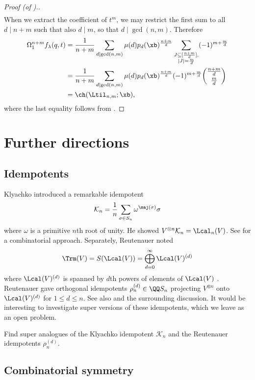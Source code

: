 \begin{proof}[Proof (of ).]
\begin{align*}
    \end{align*}
    When we extract the coefficient of $t^m$, we may restrict the first sum to all $d \mid n+m$ such that also $d \mid m$, so that $d \mid \gcd(n,m)$. Therefore
    \begin{align*}
    [t^m]\Omega_1^{n+m}f_\lambda(q,t) &= \frac{1}{n+m} \sum_{d \mid \gcd(n,m)} \mu(d) p_d(\xb)^\frac{n+m}{d} \sum_{\substack{J \subseteq [\frac{n+m}{d}], \\ |J| = \frac{m}{d}}} (-1)^{m + \frac{m}{d}} \\
    &= \frac{1}{n+m} \sum_{d \mid \gcd(n,m)} \mu(d) p_d(\xb)^\frac{n+m}{d} (-1)^{m + \frac{m}{d}} \binom{\frac{n+m}{d}}{\frac{m}{d}} \\
    &= \ch(\Ltil_{n,m};\xb),
    \end{align*}
    where the last equality follows from .
\end{proof}

\section{Further directions}\label{sec:addl}

\subsection{Idempotents}

Klyachko \cite{Kly} introduced a remarkable idempotent
  \[ \mathcal{K}_n = \frac{1}{n} \sum_{\sigma \in S_n} \omega^{\maj(\sigma)} \sigma \]
where $\omega$ is a primitive $n$th root of unity. He showed $V^{\otimes n} \mathcal{K}_n = \Lcal_n(V)$. See \cite[\S4]{Gar} for a combinatorial approach. Separately, Reutenauer noted
  \[ \Trm(V) = S(\Lcal(V)) = \bigoplus_{d=0}^\infty \Lcal(V)^{(d)} \]
where $\Lcal(V)^{(d)}$ is spanned by $d$th powers of elements of $\Lcal(V)$ \cite[\S2]{Reu-idemp}. Reutenauer gave orthogonal idempotents $\rho_n^{(d)} \in \QQ S_n$ projecting $V^{\otimes n}$ onto $\Lcal(V)^{(d)}$ for $1 \leq d \leq n$. See also \cite[Thm.~7.3]{Gar} and the surrounding discussion. It would be interesting to investigate super versions of these idempotents, which we leave as an open problem.

\begin{prob}
    Find super analogues of the Klyachko idempotent $\mathcal{K}_n$ and the Reutenauer idempotents $\rho_n^{(d)}$.
\end{prob}

\subsection{Combinatorial symmetry}

